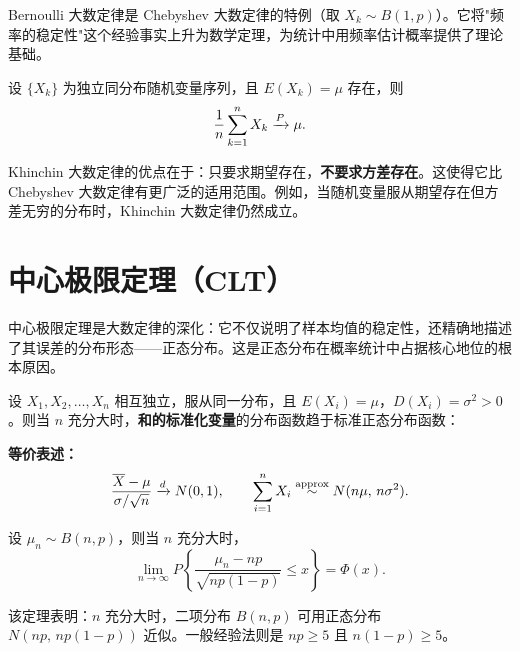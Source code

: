 \begin{remark}
Bernoulli 大数定律是 Chebyshev 大数定律的特例（取 $X_k \sim B(1, p)$）。它将"频率的稳定性"这个经验事实上升为数学定理，为统计中用频率估计概率提供了理论基础。
\end{remark}

\begin{theorem}
设 $\{X_k\}$ 为独立同分布随机变量序列，且 $E(X_k) = \mu$ 存在，则
\[\frac{1}{n} \sum_{k=1}^{n} X_k \xrightarrow{P} \mu.\]
\end{theorem}

\begin{remark}
Khinchin 大数定律的优点在于：只要求期望存在，\textbf{不要求方差存在}。这使得它比 Chebyshev 大数定律有更广泛的适用范围。例如，当随机变量服从期望存在但方差无穷的分布时，Khinchin 大数定律仍然成立。
\end{remark}

\section{中心极限定理（CLT）}

中心极限定理是大数定律的深化：它不仅说明了样本均值的稳定性，还精确地描述了其误差的分布形态——正态分布。这是正态分布在概率统计中占据核心地位的根本原因。

\begin{theorem}
设 $X_1, X_2, \ldots, X_n$ 相互独立，服从同一分布，且 $E(X_i) = \mu$，$D(X_i) = \sigma^2 > 0$。则当 $n$ 充分大时，\textbf{和的标准化变量}的分布函数趋于标准正态分布函数：
\begin{myformula}
\end{myformula}

\textbf{等价表述：}
\[\frac{\overline{X} - \mu}{\sigma / \sqrt{n}} \xrightarrow{d} N(0, 1),\qquad
\sum_{i=1}^{n} X_i \stackrel{\text{approx}}{\sim} N(n\mu,\, n\sigma^2).\]
\end{theorem}

\begin{theorem}
设 $\mu_n \sim B(n, p)$，则当 $n$ 充分大时，
\[\lim_{n \to \infty} P\!\left\{\frac{\mu_n - np}{\sqrt{np(1-p)}} \leq x\right\} = \Phi(x).\]
\end{theorem}

\begin{remark}
该定理表明：$n$ 充分大时，二项分布 $B(n, p)$ 可用正态分布 $N(np,\, np(1-p))$ 近似。一般经验法则是 $np \geq 5$ 且 $n(1-p) \geq 5$。
\end{remark}

